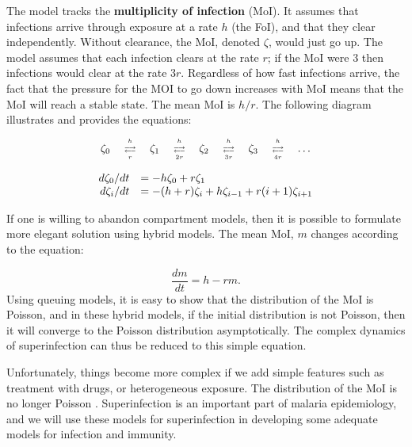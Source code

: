\documentclass[
]{book}
\begin{document}
The model tracks the \textbf{multiplicity of infection} (MoI). It assumes that infections arrive through exposure at a rate \(h\) (the FoI), and that they clear independently. Without clearance, the MoI, denoted \(\zeta\), would just go up. The model assumes that each infection clears at the rate \(r\); if the MoI were \(3\) then infections would clear at the rate \(3r\). Regardless of how fast infections arrive, the fact that the pressure for the MOI to go down increases with MoI means that the MoI will reach a stable state. The mean MoI is \(h/r.\) The following diagram illustrates and provides the equations:

\begin{equation*}
\begin{array}{c}
%
\begin{array}{ccccccccc}
\zeta_0 &  {h\atop \longrightarrow} \atop {\longleftarrow \atop r} & \zeta_1  & {h\atop \longrightarrow} \atop {\longleftarrow \atop {2r}} & \zeta_2  & {h \atop \longrightarrow} \atop {\longleftarrow \atop {3r}} & \zeta_3  & {h \atop \longrightarrow} \atop {\longleftarrow \atop {4r}}& \ldots 
\end{array} 
\\ 
\\ 
\begin{array}{rl}
d\zeta_0/dt &= -h \zeta_0 + r \zeta_1 \\ 
d \zeta_i /dt &= -(h+r) \zeta_i + h \zeta_{i-1} + r(i+1) \zeta_{i+1} \\
\end{array} 
\end{array}
\end{equation*}

If one is willing to abandon compartment models, then it is possible to formulate more elegant solution using hybrid models. The mean MoI, \(m\) changes according to the equation:

\[\frac{dm}{dt} = h - r m.\]
Using queuing models, it is easy to show that the distribution of the MoI is Poisson, and in these hybrid models, if the initial distribution is not Poisson, then it will converge to the Poisson distribution asymptotically. The complex dynamics of superinfection can thus be reduced to this simple equation.

Unfortunately, things become more complex if we add simple features such as treatment with drugs, or heterogeneous exposure. The distribution of the MoI is no longer Poisson \autocite{HenryJM2020HybridModel}. Superinfection is an important part of malaria epidemiology, and we will use these models for superinfection in developing some adequate models for infection and immunity.
\end{document}
